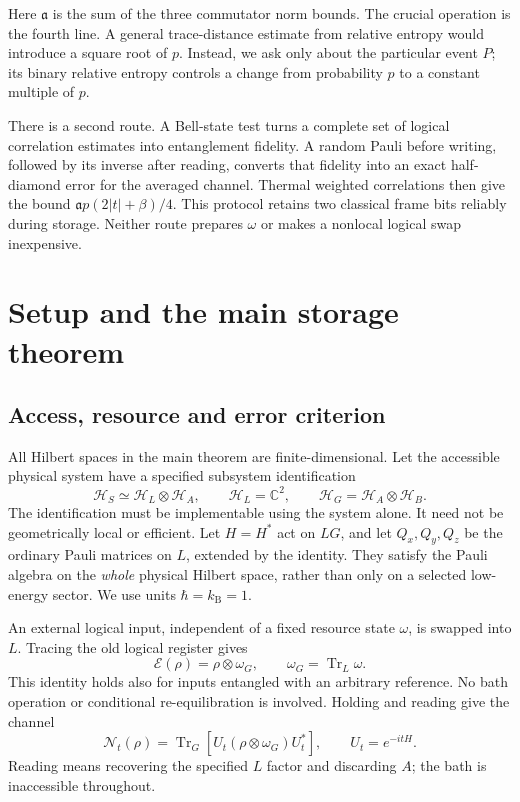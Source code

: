 \documentclass[11pt,reqno]{amsart}
\numberwithin{equation}{section}
\theoremstyle{definition}
\theoremstyle{remark}
\newcommand{\Tr}{\operatorname{Tr}}
\newcommand{\Hcal}{\mathcal H}
\newcommand{\Ncal}{\mathcal N}
\newcommand{\Ecal}{\mathcal E}
\newcommand{\pa}{\mathfrak a}
\begin{document}
Here \(\pa\) is the sum of the three commutator norm bounds.
The crucial operation is the fourth line. A general trace-distance estimate
from relative entropy would introduce a square root of \(p\). Instead,
we ask only about the particular event \(P\); its binary relative entropy
controls a change from probability \(p\) to a constant multiple of \(p\).

There is a second route. A Bell-state test turns a complete set of logical
correlation estimates into entanglement fidelity. A random Pauli before
writing, followed by its inverse after reading, converts that fidelity
into an exact half-diamond error for the averaged channel. Thermal
weighted correlations then give the bound
\(\pa p(2|t|+\beta)/4\).
This protocol retains two classical frame bits reliably during storage.
Neither route prepares \(\omega\) or makes a nonlocal logical swap inexpensive.

\clearpage
\section{Setup and the main storage theorem}\label{sec:results}

\subsection{Access, resource and error criterion}

All Hilbert spaces in the main theorem are finite-dimensional. Let the
accessible physical system have a specified subsystem identification
\[
             \Hcal_S\simeq\Hcal_L\otimes\Hcal_A,
             \qquad \Hcal_L=\mathbb C^2,
             \qquad \Hcal_G=\Hcal_A\otimes\Hcal_B.
\]
The identification must be implementable using the system alone. It need
not be geometrically local or efficient. Let \(H=H^*\) act on \(L G\),
and let \(Q_x,Q_y,Q_z\) be the ordinary Pauli matrices on \(L\), extended
by the identity. They satisfy the Pauli algebra on the \emph{whole}
physical Hilbert space, rather than only on a selected low-energy sector.
We use units \(\hbar=k_{\mathrm B}=1\).

An external logical input, independent of a fixed resource state \(\omega\),
is swapped into \(L\). Tracing the old logical register gives
\begin{equation}\label{eq:encoder}
 \Ecal(\rho)=\rho\otimes\omega_G,\qquad
 \omega_G=\Tr_L\omega .
\end{equation}
This identity holds also for inputs entangled with an arbitrary reference.
No bath operation or conditional re-equilibration is involved.
Holding and reading give the channel
\begin{equation}\label{eq:memory}
 \Ncal_t(\rho)=\Tr_G\!\left[U_t(\rho\otimes\omega_G)U_t^*\right],
 \qquad U_t=e^{-itH}.
\end{equation}
Reading means recovering the specified \(L\) factor and discarding \(A\);
the bath is inaccessible throughout.
\end{document}
